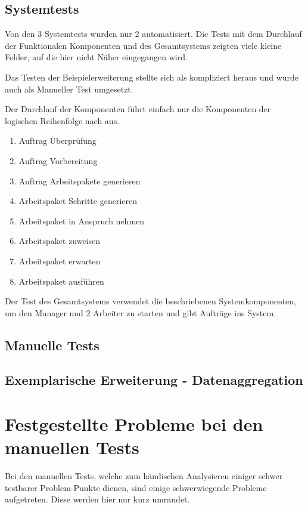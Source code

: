 \subsection{Systemtests}

Von den 3 Systemtests wurden nur 2 automatisiert.
Die Tests mit dem Durchlauf der Funktionalen Komponenten und des Gesamtsystems
zeigten viele kleine Fehler, auf die hier nicht Näher eingegangen wird.

Das Testen der Beispielerweiterung stellte sich als kompliziert heraus und wurde auch als Manueller Test umgesetzt.

Der Durchlauf der Komponenten führt einfach nur die Komponenten der logischen Reihenfolge nach aus.
\begin{enumerate}
    \item Auftrag Überprüfung
    \item Auftrag Vorbereitung
    \item Auftrag Arbeitspakete generieren
    \item Arbeitspaket Schritte generieren
    \item Arbeitspaket in Anspruch nehmen
    \item Arbeitspaket zuweisen
    \item Arbeitspaket erwarten
    \item Arbeitspaket ausführen
\end{enumerate}

Der Test des Gesamtsystems verwendet die beschriebenen Systemkomponenten, um den Manager und 2 Arbeiter zu starten und gibt Aufträge ins System.

\subsection{Manuelle Tests}

\subsection{Exemplarische Erweiterung - Datenaggregation}




\section{Festgestellte Probleme bei den manuellen Tests}

Bei den manuellen Tests, welche zum händischen Analysieren
einiger schwer testbarer Problem-Punkte dienen,
sind einige schwerwiegende Probleme aufgetreten.
Diese werden hier nur kurz umrandet.

